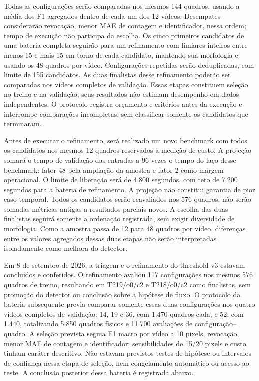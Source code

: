 Todas as configurações serão comparadas nos mesmos 144 quadros, usando a média dos F1 agregados dentro de cada um dos 12 vídeos. Desempates considerarão revocação, menor MAE de contagem e identificador, nessa ordem; tempo de execução não participa da escolha. Os cinco primeiros candidatos de uma bateria completa seguirão para um refinamento com limiares inteiros entre menos 15 e mais 15 em torno de cada candidato, mantendo sua morfologia e usando os 48 quadros por vídeo. Configurações repetidas serão deduplicadas, com limite de 155 candidatos. As duas finalistas desse refinamento poderão ser comparadas nos vídeos completos de validação. Essas etapas constituem seleção no treino e na validação; seus resultados não estimam desempenho em dados independentes. O protocolo registra orçamento e critérios antes da execução e interrompe comparações incompletas, sem classificar somente os candidatos que terminaram.

Antes de executar o refinamento, será realizado um novo benchmark com todos os candidatos nos mesmos 12 quadros reservados à medição de custo. A projeção somará o tempo de validação das entradas a 96 vezes o tempo do laço desse benchmark: fator 48 pela ampliação da amostra e fator 2 como margem operacional. O limite de liberação será de 4.800 segundos, com teto de 7.200 segundos para a bateria de refinamento. A projeção não constitui garantia de pior caso temporal. Todos os candidatos serão reavaliados nos 576 quadros; não serão somadas métricas antigas a resultados parciais novos. A escolha das duas finalistas seguirá somente a ordenação registrada, sem exigir diversidade de morfologia. Como a amostra passa de 12 para 48 quadros por vídeo, diferenças entre os valores agregados dessas duas etapas não serão interpretadas isoladamente como melhora do detector.

Em 8 de setembro de 2026, a triagem e o refinamento do threshold v3 estavam concluídos e conferidos. O refinamento avaliou 117 configurações nos mesmos 576 quadros de treino, resultando em T219/o0/c2 e T218/o0/c2 como finalistas, sem promoção do detector ou conclusão sobre a hipótese de fluxo. O protocolo da bateria subsequente previa comparar somente essas duas configurações nos quatro vídeos completos de validação: 14, 19 e 36, com 1.470 quadros cada, e 52, com 1.440, totalizando 5.850 quadros físicos e 11.700 avaliações de configuração--quadro. A seleção prevista seguia F1 macro por vídeo a 10 pixels, revocação, menor MAE de contagem e identificador; sensibilidades de 15/20 pixels e custo tinham caráter descritivo. Não estavam previstos testes de hipótese ou intervalos de confiança nessa etapa de seleção, nem congelamento automático ou acesso ao teste. A conclusão posterior dessa bateria é registrada abaixo.

